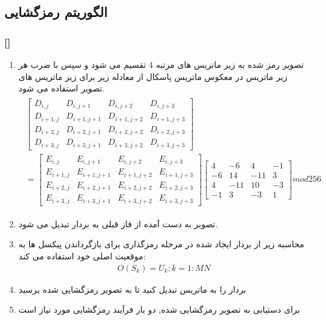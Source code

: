 \documentclass[xcolor=dvipsnames, professionalfonts, 11pt]{beamer}
\newcommand*{\makeframetitle}{\frametitle{\insertsection \hspace{0.1em} {\footnotesize [\insertsubsection]}}}
\begin{document}
\subsection{الگوریتم رمزگشایی}
\begin{frame}[allowframebreaks]
\makeframetitle
\begin{enumerate}
    \item تصویر رمز شده  به زیر ماتریس های مرتبه 4 تقسیم می شود و سپس با ضرب هر زیر ماتریس در معکوس ماتریس پاسکال از معادله زیر برای زیر ماتریس های تصویر استفاده می شود.
    {\footnotesize
    \begin{align}
        \begin{split}
            \begin{bmatrix}
                D_{i,j} & D_{i,j+1} & D_{i,j+2} & D_{i,j+3}\\
                D_{i+1,j} & D_{i+1,j+1} & D_{i+1,j+2} & D_{i+1,j+3}\\
                D_{i+2,j} & D_{i+2,j+1} & D_{i+2,j+2} & D_{i+2,j+3}\\
                D_{i+3,j} & D_{i+3,j+1} & D_{i+3,j+2} & D_{i+3,j+3}
            \end{bmatrix}\\ = 
            \begin{bmatrix}
                E_{i,j} & E_{i,j+1} & E_{i,j+2} & E_{i,j+3}\\
                E_{i+1,j} & E_{i+1,j+1} & E_{i+1,j+2} & E_{i+1,j+3}\\
                E_{i+2,j} & E_{i+2,j+1} & E_{i+2,j+2} & E_{i+2,j+3}\\
                E_{i+3,j} & E_{i+3,j+1} & E_{i+3,j+2} & E_{i+3,j+3}
            \end{bmatrix}
            \begin{bmatrix}
                4 & -6 & 4 & -1\\
                -6 & 14 & -11 & 3\\
                4 & -11 & 10 & -3\\
                -1 & 3 & -3 & 1
            \end{bmatrix} mod 256
        \end{split}
    \end{align}
    }
    \item تصویر  به دست آمده از فاز قبلی به بردار  تبدیل می شود.
    \item محاسبه زیر از بردار  ایجاد شده در مرحله رمزگذاری برای بازگرداندن پیکسل ها به موقعیت اصلی خود استفاده می کند:
    \begin{align}
        O(S_k) = U_k; k = 1 : MN 
    \end{align}
    \item بردار  را به ماتریس تبدیل کنید تا به تصویر رمزگشایی شده  برسید
    \item برای دستیابی به تصویر رمزگشایی شده, دو بار فرآیند رمزگشایی مورد نیاز است
\end{enumerate}
\end{frame}
\end{document}
